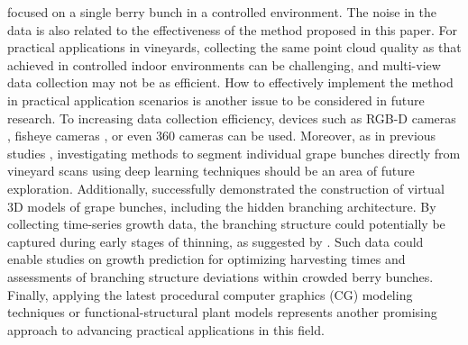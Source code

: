 \documentclass[12pt]{article}
\begin{document}

 focused on a single berry bunch in a controlled environment.
The noise in the data is also related to the effectiveness of the method proposed in this paper.
For practical applications in vineyards, collecting the same point cloud quality as that achieved in controlled indoor environments can be challenging, and multi-view data collection may not be as efficient.
How to effectively implement the method in practical application scenarios is another issue to be considered in future research.
To increasing data collection efficiency, devices such as RGB-D cameras \citep{blok_highthroughput_2025}, fisheye cameras \citep{tamura_unsupervised_2025}, or even 360 cameras can be used.
Moreover, as in previous studies \citep{rose_automated_2016, luo_3d_2023}, investigating methods to segment individual grape bunches directly from vineyard scans using deep learning techniques should be an area of future exploration.
Additionally, \citet[Fig.~9]{scholer_automated_2015} successfully demonstrated the construction of virtual 3D models of grape bunches, including the hidden branching architecture. 
By collecting time-series growth data, the branching structure could potentially be captured during early stages of thinning, as suggested by \citep{du_instance_2023}.
Such data could enable studies on growth prediction for optimizing harvesting times and assessments of branching structure deviations within crowded berry bunches.
Finally, applying the latest procedural computer graphics (CG) modeling techniques or functional-structural plant models represents another promising approach to advancing practical applications in this field.
\end{document}
